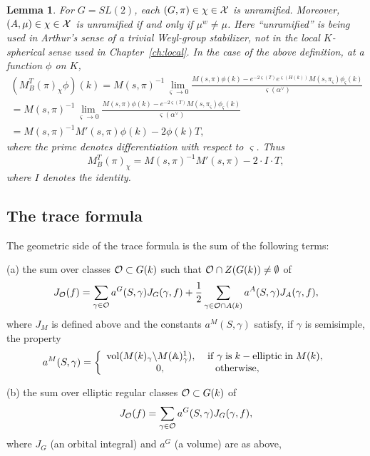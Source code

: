 \documentclass[12pt,letterpaper,openany]{book}
\theoremstyle{plain}
\newtheorem{lemma}[theorem]{Lemma}
\theoremstyle{definition}
\theoremstyle{remark}
\theoremstyle{remark}
\begin{document}
\begin{lemma}
For $G=SL(2)$, each $(G,\pi)\in\chi\in{\cal{X}}$ is
unramified. Moreover, $(A,\mu)\in\chi\in{\cal{X}}$ is unramified
if and only if $\mu^w\not=\mu$.
Here ``unramified'' is being used in Arthur's sense of
a trivial Weyl-group stabilizer, not in the local
$K$-spherical sense used in Chapter~\ref{ch:local}.
In the case of the above definition, at a function $\phi$ on $K$,
\[
\begin{array}{c}
(M^T_B(\pi)_\chi \phi)(k)=
M(s,\pi)^{-1}
\lim_{\varsigma \rightarrow 0}
{\frac{M(s,\pi)\phi(k)-e^{-2\varsigma (T)}e^{\varsigma (H(k))}
M(s,\pi_\varsigma)\phi_\varsigma(k)}{\varsigma(\alpha^\vee)}} \\
=M(s,\pi)^{-1}
\lim_{\varsigma \rightarrow 0}
{\frac{M(s,\pi)\phi(k)-e^{-2\varsigma (T)}M(s,\pi_\varsigma)\phi_\varsigma (k)}{\varsigma(\alpha^\vee)}} \\
=M(s,\pi)^{-1}M'(s,\pi)\phi(k)-2 \phi(k) T,
\end{array}
\]
where the prime denotes differentiation with respect to
$\varsigma$. Thus
\[
M_B^T(\pi )_\chi =
M(s,\pi)^{-1}M'(s,\pi)-2\cdot I\cdot T,
\]
where $I$ denotes the identity.
\end{lemma}

\subsection{The trace formula}

The geometric side of the trace formula is the sum of the following terms:

(a) the sum over classes ${\cal{O}}\subset G(k)$
such that ${\cal{O}}\cap Z(G(k))\not= \emptyset$ of
\begin{equation}
J_{\cal{O}}(f)=
\sum_{\gamma\in {\cal O}}
a^G(S,\gamma)J_G(\gamma,f)
+{\frac{1}{2}}\sum_{\gamma\in {\cal O}\cap A(k)}
a^A(S,\gamma)J_A(\gamma,f),
\end{equation}
where $J_M$ is defined above and
the constants $a^M(S,\gamma )$ satisfy, if $\gamma$ is semisimple,
the property
\[
a^M(S,\gamma )=\left\{
\begin{array}{c}
\operatorname{vol}(M(k)_\gamma \backslash M({\mathbb {A}})_\gamma ^1),
\;\;\;\;{\rm if\;}\gamma \;{\rm is}\;
k-{\rm elliptic\;in}\;M(k), \\
0,\;\;\;\;\;\;\;\;\;\;\;\;\;\;\;\;\;\;{\rm otherwise},\;\;\;\;\;
\end{array}
\right.
\]

(b) the sum over elliptic regular classes ${\cal{O}}\subset G(k)$
of
\begin{equation}
J_{\cal{O}}(f)=
\sum_{\gamma\in {\cal O}}
a^G(S,\gamma)J_G(\gamma,f),
\end{equation}
where $J_G$ (an orbital integral) and $a^G$ (a volume)
are as above,
\end{document}
